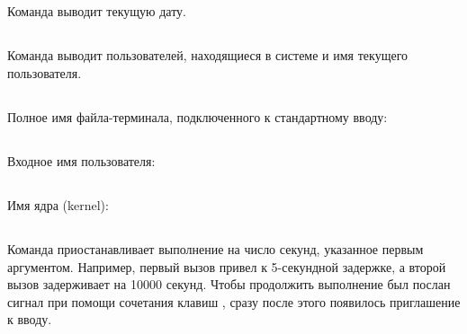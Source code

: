 \vspace{-1em}
\subsection{}

Команда  выводит текущую дату.


\subsection{}

Команда  выводит пользователей, находящиеся в системе и имя текущего пользователя.


\subsection{}

Полное имя файла-терминала, подключенного к стандартному вводу:


\subsection{}

Входное имя пользователя:


\subsection{}

Имя ядра (kernel):


\subsection{}

Команда  приостанавливает выполнение на число секунд, указанное первым аргументом. Например, первый вызов привел к 5-секундной задержке, а второй вызов задерживает на 10000 секунд. Чтобы продолжить выполнение был послан сигнал  при помощи сочетания клавиш , сразу после этого появилось приглашение к вводу.


\subsection{}

